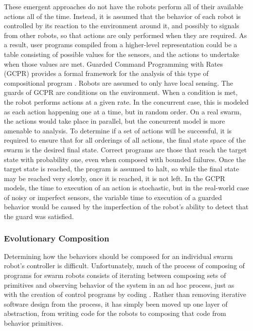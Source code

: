 These emergent approaches do not have the robots perform all of their available actions all of the time. 
Instead, it is assumed that the behavior of each robot is controlled by its reaction to the environment around it, and possibly to signals from other robots, so that actions are only performed when they are required. 
As a result, user programs compiled from a higher-level representation could be a table consisting of possible values for the sensors, and the actions to undertake when those values are met.
Guarded Command Programming with Rates (GCPR) provides a formal framework for the analysis of this type of compositional program \cite{napp2011compositional}. 
Robots are assumed to only have local sensing.
The guards of GCPR are conditions on the environment.
When a condition is met, the robot performs actions at a given rate. 
In the concurrent case, this is modeled as each action happening one at a time, but in random order. 
On a real swarm, the actions would take place in parallel, but the concurrent model is more amenable to analysis. 
To determine if a set of actions will be successful, it is required to ensure that for all orderings of all actions, the final state space of the swarm is the desired final state. 
Correct programs are those that reach the target state with probability one, even when composed with bounded failures. 
Once the target state is reached, the program is assumed to halt, so while the final state may be reached very slowly, once it is reached, it is not left. 
In the GCPR models, the time to execution of an action is stochastic, but in the real-world case of noisy or imperfect sensors, the variable time to execution of a guarded behavior would be caused by the imperfection of the robot's ability to detect that the guard was satisfied. 

\subsubsection{Evolutionary Composition}

Determining how the behaviors should be composed for an individual swarm robot's controller is difficult. 
Unfortunately, much of the process of composing of programs for swarm robots consists of iterating between composing sets of primitives and observing behavior of the system in an ad hoc process, just as with the creation of control programs by coding \cite{palmer2005behavioral}. 
Rather than removing iterative software design from the process, it has simply been moved up one layer of abstraction, from writing code for the robots to composing that code from behavior primitives. 

